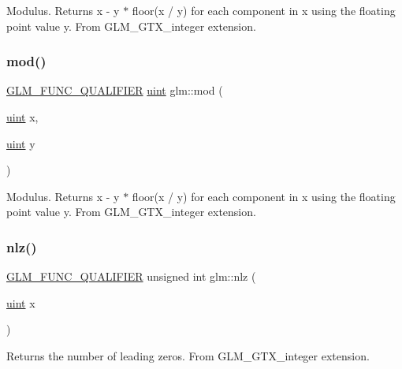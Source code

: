Modulus. Returns x -\/ y $\ast$ floor(x / y) for each component in x using the floating point value y. From G\+L\+M\+\_\+\+G\+T\+X\+\_\+integer extension. \mbox{\label{group__gtx__integer_gab8f9ec0ca93ca90669434224818f0750}} 
\subsubsection{\texorpdfstring{mod()}{mod()}\hspace{0.1cm}{\footnotesize\ttfamily [2/2]}}
{\footnotesize\ttfamily \hyperlink{setup_8hpp_a33fdea6f91c5f834105f7415e2a64407}{G\+L\+M\+\_\+\+F\+U\+N\+C\+\_\+\+Q\+U\+A\+L\+I\+F\+I\+ER} \hyperlink{group__core__precision_ga4fd29415871152bfb5abd588334147c8}{uint} glm\+::mod (\begin{DoxyParamCaption}\item[{\hyperlink{group__core__precision_ga4fd29415871152bfb5abd588334147c8}{uint}}]{x,  }\item[{\hyperlink{group__core__precision_ga4fd29415871152bfb5abd588334147c8}{uint}}]{y }\end{DoxyParamCaption})}

Modulus. Returns x -\/ y $\ast$ floor(x / y) for each component in x using the floating point value y. From G\+L\+M\+\_\+\+G\+T\+X\+\_\+integer extension. \mbox{\label{group__gtx__integer_gacbe62fd2384464c16ea30ecc4defc11c}} 
\subsubsection{\texorpdfstring{nlz()}{nlz()}}
{\footnotesize\ttfamily \hyperlink{setup_8hpp_a33fdea6f91c5f834105f7415e2a64407}{G\+L\+M\+\_\+\+F\+U\+N\+C\+\_\+\+Q\+U\+A\+L\+I\+F\+I\+ER} unsigned int glm\+::nlz (\begin{DoxyParamCaption}\item[{\hyperlink{group__core__precision_ga4fd29415871152bfb5abd588334147c8}{uint}}]{x }\end{DoxyParamCaption})}

Returns the number of leading zeros. From G\+L\+M\+\_\+\+G\+T\+X\+\_\+integer extension. \mbox{\label{group__gtx__integer_ga4937910d5d82dfd9c4bab3da7ff75399}} 
